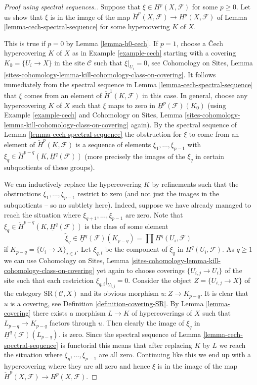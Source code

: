 \begin{proof}[Proof using spectral sequences.]
Suppose that $\xi \in H^p(X, \mathcal{F})$ for some $p \geq 0$.
Let us show that $\xi$ is in the image of the map
$\check{H}^p(X, \mathcal{F}) \to H^p(X, \mathcal{F})$ of
Lemma \ref{lemma-cech-spectral-sequence}
for some hypercovering $K$ of $X$.

\medskip\noindent
This is true if $p = 0$ by Lemma \ref{lemma-h0-cech}.
If $p = 1$, choose a {\v C}ech hypercovering $K$ of $X$ as in
Example \ref{example-cech} starting with a covering
$K_0 = \{U_i \to X\}$ in the site $\mathcal{C}$ such that
$\xi|_{U_i} = 0$, see
Cohomology on Sites,
Lemma \ref{sites-cohomology-lemma-kill-cohomology-class-on-covering}.
It follows immediately from the spectral sequence
in Lemma \ref{lemma-cech-spectral-sequence} that $\xi$ comes
from an element of $\check{H}^1(K, \mathcal{F})$ in this case.
In general, choose any hypercovering $K$ of $X$ such
that $\xi$ maps to zero in $\underline{H}^p(\mathcal{F})(K_0)$
(using Example \ref{example-cech} and
Cohomology on Sites,
Lemma \ref{sites-cohomology-lemma-kill-cohomology-class-on-covering}
again).
By the spectral sequence of Lemma \ref{lemma-cech-spectral-sequence}
the obstruction for $\xi$ to come from an element of
$\check{H}^p(K, \mathcal{F})$ is a sequence of elements
$\xi_1, \ldots, \xi_{p - 1}$ with
$\xi_q \in \check{H}^{p - q}(K, \underline{H}^q(\mathcal{F}))$
(more precisely the images of the $\xi_q$ in certain subquotients
of these groups).

\medskip\noindent
We can inductively replace the hypercovering $K$ by refinements
such that the obstructions $\xi_1, \ldots, \xi_{p - 1}$ restrict to zero
(and not just the images
in the subquotients -- so no subtlety here). Indeed, suppose we have
already managed to reach the situation where
$\xi_{q + 1}, \ldots, \xi_{p - 1}$ are zero.
Note that $\xi_q \in \check{H}^{p - q}(K, \underline{H}^q(\mathcal{F}))$
is the class of some element
$$
\tilde \xi_q \in
\underline{H}^q(\mathcal{F})(K_{p - q}) =
\prod H^q(U_i, \mathcal{F})
$$
if $K_{p - q} = \{U_i \to X\}_{i \in I}$. Let $\xi_{q, i}$
be the component of $\tilde \xi_q$ in $H^q(U_i, \mathcal{F})$.
As $q \geq 1$ we can use
Cohomology on Sites,
Lemma \ref{sites-cohomology-lemma-kill-cohomology-class-on-covering}
yet again to choose coverings $\{U_{i, j} \to U_i\}$
of the site such that each restriction $\xi_{q, i}|_{U_{i, j}} = 0$.
Consider the object $Z = \{U_{i, j} \to X\}$ of the category
$\text{SR}(\mathcal{C}, X)$ and its obvious morphism
$u : Z \to K_{p - q}$. It is clear that $u$ is a covering, see
Definition \ref{definition-covering-SR}. By
Lemma \ref{lemma-covering} there
exists a morphism $L \to K$ of hypercoverings of $X$ such that
$L_{p - q} \to K_{p - q}$ factors through $u$. Then clearly the
image of $\xi_q$ in $\underline{H}^q(\mathcal{F})(L_{p - q})$.
is zero. Since the spectral sequence of
Lemma \ref{lemma-cech-spectral-sequence}
is functorial this means that after replacing $K$ by $L$ we reach the
situation where $\xi_q, \ldots, \xi_{p - 1}$ are all zero.
Continuing like this we end up with a hypercovering where they are all
zero and hence $\xi$ is in the image of the map
$\check{H}^p(X, \mathcal{F}) \to H^p(X, \mathcal{F})$.


\end{proof}
